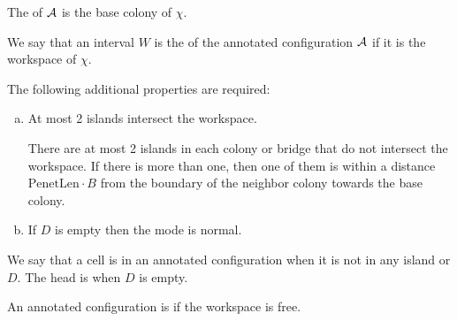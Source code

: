 \documentclass[12pt]{memoir}
\newcommand{\fld}[1]{\ensuremath{\textit{#1}}}
\def\B{B}
\newcommand{\D}{D}
\newcommand{\PenetrationLen}{\mathrm{PenetLen}}
\newcommand{\pos}{\mathrm{pos}}
\newcommand{\cDir}{\fld{cDir}}
\begin{document}
\begin{definition}
    The  of \( \mathcal{A} \) is the base colony of \( \chi \).

    We say that an interval \( W \) is the %
     of the annotated
    configuration \( \mathcal{A} \) if it is the %
    workspace of \( \chi \).

    The following additional properties are required:
    \begin{enumerate}[(a)]
        \item \label{i:annotated-config.islands}
          At most 2 islands intersect the workspace.

          There are at most 2 islands in each colony or bridge
            that do not intersect the workspace.
            If there is more than one, then one of them is within
            a distance \( \PenetrationLen\cdot\B \) from the boundary of the neighbor colony
            towards the base colony.

        \item
            If \( \D \) is empty then the mode is normal.
%



    \end{enumerate}



    We say that a cell is  in an annotated configuration
    when it is not in any island or \( \D \).
    The head is  when \( \D \) is empty.

    An  annotated configuration is  if the workspace is free.
\end{definition}
\end{document}

